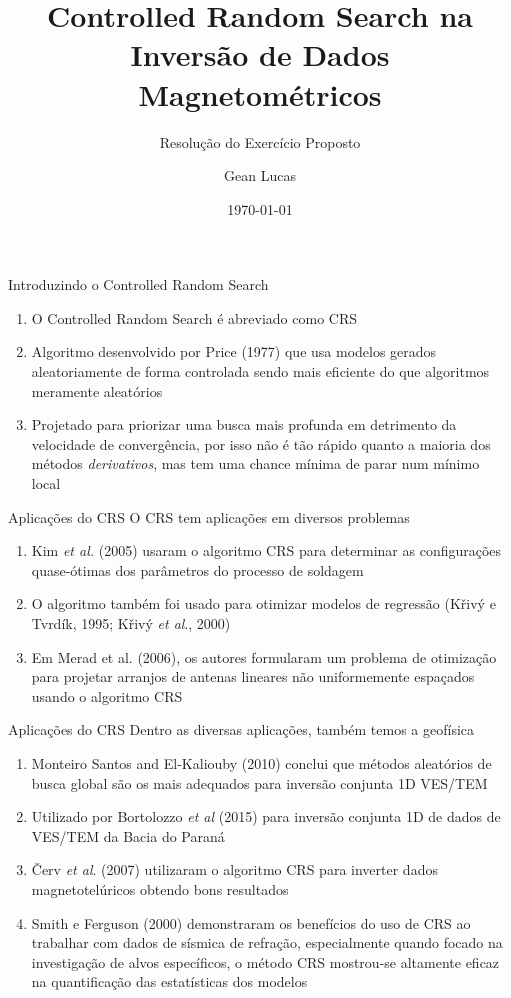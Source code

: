 \documentclass{beamer}
\title[Controlled Random Search]{Controlled Random Search na Inversão de Dados Magnetométricos}
\subtitle{Resolução do Exercício Proposto}
\author{Gean Lucas}
\institute{Observatório Nacional}
\date\today
\begin{document}

\begin{frame}
\titlepage
\end{frame}

\begin{frame}{Introduzindo o Controlled Random Search}
\begin{enumerate}
\item O Controlled Random Search é abreviado como CRS
\item Algoritmo desenvolvido por Price (1977) que usa modelos gerados aleatoriamente de forma controlada sendo mais eficiente do que algoritmos meramente aleatórios 
\item Projetado para priorizar uma busca mais profunda em detrimento da velocidade de convergência, por isso não é tão rápido quanto a maioria dos métodos \emph{derivativos}, mas tem uma chance mínima de parar num mínimo local
\end{enumerate}
\end{frame}

\begin{frame}{Aplicações do CRS}
O CRS tem aplicações em diversos problemas
\begin{enumerate}
\item Kim \emph{et al.} (2005) usaram o algoritmo CRS para determinar as configurações quase-ótimas dos parâmetros do processo de soldagem
\item O algoritmo também foi usado para otimizar modelos de regressão (Křivý e Tvrdík, 1995; Křivý \emph{et al}., 2000)
\item Em Merad et al. (2006), os autores formularam um problema de otimização para projetar arranjos de antenas lineares não uniformemente espaçados usando o algoritmo CRS
\end{enumerate}
\end{frame}

\begin{frame}{Aplicações do CRS}
Dentro as diversas aplicações, também temos a geofísica
\begin{enumerate}
\item Monteiro Santos and El-Kaliouby (2010) conclui que métodos aleatórios de busca global são os mais adequados para inversão conjunta 1D VES/TEM
\item Utilizado por Bortolozzo \emph{et al} (2015) para inversão conjunta 1D de dados de VES/TEM da Bacia do Paraná
\item Červ \emph{et al}. (2007) utilizaram o algoritmo CRS para inverter dados magnetotelúricos obtendo bons resultados
\item Smith e Ferguson (2000) demonstraram os benefícios do uso de CRS ao trabalhar com dados de sísmica de refração, especialmente quando focado na investigação de alvos específicos, o método CRS mostrou-se altamente eficaz na quantificação das estatísticas dos modelos
\end{enumerate}

\end{frame}
\end{document}
